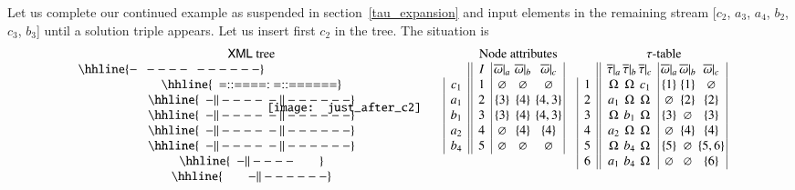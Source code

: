 Let us complete our continued example as suspended in
section~\ref{tau_expansion} and input elements in the remaining
stream [\(c_2\), \(a_3\), \(a_4\), \(b_2\), \(c_3\), \(b_3\)] until a
solution triple appears. Let us insert first \(c_2\) in the \XML
tree. The situation is
\[
\begin{array}{cc|c||c|@{\,}c@{\,}@{\,}c@{\,}@{\,}c@{\,}|c|c||c@{\,}c@{\,}c|@{\,}c@{\,}c@{\,}c@{\,}|}
  \text{\XML tree} 
& \multicolumn{2}{c}{} 
& \multicolumn{4}{c}{\text{Node attributes}} 
& \multicolumn{2}{c}{}
& \multicolumn{6}{c}{\tau\text{-table}}\\
\hhline{-~~----~~------}
\multirow{6}{*}{ 
\texttt{[image: just\_after\_c2]}
}
& \multicolumn{2}{c||}{} 
& I 
& \overline{\omega}|_a & \overline{\omega}|_b & \overline{\omega}|_c
& \multicolumn{2}{c||}{} 
& \overline{\tau}|_a & \overline{\tau}|_b & \overline{\tau}|_c 
& \overline{\omega}|_a & \overline{\omega}|_b & \overline{\omega}|_c\\
\hhline{~~=::====:~=::======}
&& c_1 & 1 & \varnothing & \varnothing & \varnothing & & 
1 & \Omega & \Omega & c_1 & \{1\} & \{1\} & \varnothing\\
\hhline{~~-||----~-||------}
&& a_1 & 2 & \{3\} & \{4\} & \{4, 3\} & & 
2 & a_1 & \Omega & \Omega & \varnothing & \{2\} & \{2\}\\
\hhline{~~-||----~-||------}
&& b_1 & 3 & \{3\} & \{4\} & \{4, 3\} & & 
3 & \Omega & b_1 & \Omega & \{3\} & \varnothing & \{3\}\\
\hhline{~~-||----~-||------}
&& a_2 & 4 & \varnothing & \{4\} & \{4\} & & 
4 & a_2 & \Omega & \Omega & \varnothing & \{4\} & \{4\}\\
\hhline{~~-||----~-||------}
&& b_4 & 5 & \varnothing & \varnothing & \varnothing & & 
5 & \Omega & b_4 & \Omega & \{5\} & \varnothing & \{5,6\}\\
\hhline{~~-||----~~~~~~~~}
&
\multicolumn{6}{c}{} && 
6 & a_1 & b_4 & \Omega & \varnothing & \varnothing & \{6\}\\
\hhline{~~~~~~~~-||------}
\end{array}
\]

